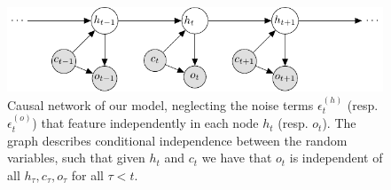         \newcommand\ndistr[2]{\mathcal{N}(#1, #2)}
        \newcommand\noise[1]{\epsilon^{(#1)}}

        \begin{figure}[h]
            \includegraphics{Files/graphical_model/graphical_model}
            \caption{Causal network of our model, neglecting the noise terms $\noise{h}_t$ (resp. $\noise{o}_t$) that feature independently in each node $h_t$ (resp. $o_t$).
            The graph describes conditional independence between the random variables, such that given $h_t$ and $c_t$ we have that $o_t$ is independent of all $h_\tau, c_\tau, o_\tau$ for all $\tau < t$.}
            \label{fig:SSM}
        \end{figure}

